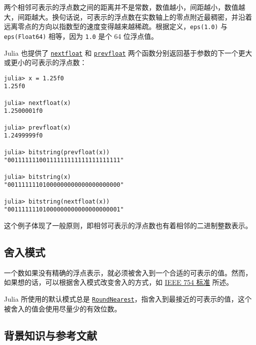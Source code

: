 两个相邻可表示的浮点数之间的距离并不是常数，数值越小，间距越小，数值越大，间距越大。换句话说，可表示的浮点数在实数轴上的零点附近最稠密，并沿着远离零点的方向以指数型的速度变得越来越稀疏。根据定义，\texttt{eps(1.0)} 与 \texttt{eps(Float64)} 相等，因为 \texttt{1.0} 是个 64 位浮点值。



Julia 也提供了 \hyperlink{8339500090035450608}{\texttt{nextfloat}} 和 \hyperlink{14035790731013288499}{\texttt{prevfloat}} 两个函数分别返回基于参数的下一个更大或更小的可表示的浮点数：




\begin{verbatim}
julia> x = 1.25f0
1.25f0

julia> nextfloat(x)
1.2500001f0

julia> prevfloat(x)
1.2499999f0

julia> bitstring(prevfloat(x))
"00111111100111111111111111111111"

julia> bitstring(x)
"00111111101000000000000000000000"

julia> bitstring(nextfloat(x))
"00111111101000000000000000000001"
\end{verbatim}



这个例子体现了一般原则，即相邻可表示的浮点数也有着相邻的二进制整数表示。



\hypertarget{5125794393878787955}{}


\subsection{舍入模式}



一个数如果没有精确的浮点表示，就必须被舍入到一个合适的可表示的值。然而，如果想的话，可以根据舍入模式改变舍入的方式，如 \href{https://en.wikipedia.org/wiki/IEEE\_754-2008}{IEEE 754 标准} 所述。



Julia 所使用的默认模式总是 \hyperlink{868115654703135309}{\texttt{RoundNearest}}，指舍入到最接近的可表示的值，这个被舍入的值会使用尽量少的有效位数。



\hypertarget{15305582934630811831}{}


\subsection{背景知识与参考文献}



